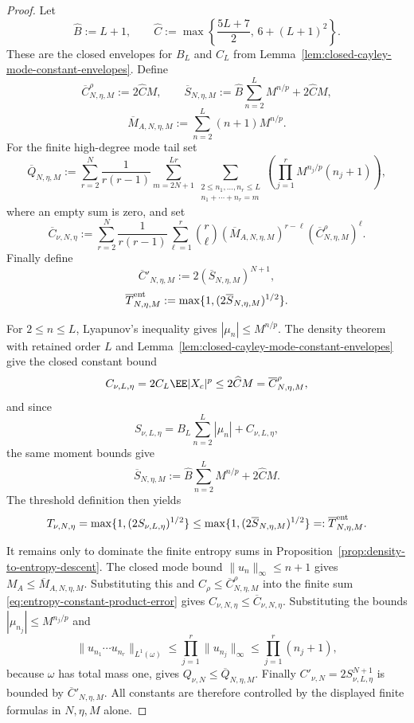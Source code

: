 \begin{proof}
Let
\[
\widehat B:=L+1,\qquad
\widehat C:=\max\!\left\{\frac{5L+7}{2},\,6+(L+1)^2\right\}.
\]
These are the closed envelopes for \(B_L\) and \(C_L\) from
Lemma~\ref{lem:closed-cayley-mode-constant-envelopes}.  Define
\[
\overline C_{N,\eta,M}^{\rho}:=2\widehat C M,
\qquad
\overline S_{N,\eta,M}:=
\widehat B\sum_{n=2}^{L}M^{n/p}+2\widehat C M,
\]
\[
\overline M_{A,N,\eta,M}:=\sum_{n=2}^{L}(n+1)M^{n/p}.
\]
For the finite high-degree mode tail set
\[
\overline Q_{N,\eta,M}:=
\sum_{r=2}^{N}\frac{1}{r(r-1)}
\sum_{m=2N+1}^{Lr}
\sum_{\substack{2\le n_1,\dots,n_r\le L\\
n_1+\cdots+n_r=m}}
\left(\prod_{j=1}^{r}M^{n_j/p}(n_j+1)\right),
\]
where an empty sum is zero,
and set
\[
\overline C_{\nu,N,\eta}:=
\sum_{r=2}^{N}\frac{1}{r(r-1)}
\sum_{\ell=1}^{r}\binom r\ell
(\overline M_{A,N,\eta,M})^{r-\ell}
(\overline C_{N,\eta,M}^{\rho})^\ell .
\]
Finally define
\[
\overline C'_{N,\eta,M}:=
2(\overline S_{N,\eta,M})^{N+1},
\]
\[
\overline T_{N,\eta,M}^{\rm ent}:=
\max\{1,(2\overline S_{N,\eta,M})^{1/2}\}.
\]

For \(2\le n\le L\), Lyapunov's inequality gives
\(|\mu_n|\le M^{n/p}\).  The density theorem with retained order \(L\) and
Lemma~\ref{lem:closed-cayley-mode-constant-envelopes} give the closed
constant bound
\[
C_{\nu,L,\eta}=2C_L\EE|X_c|^p\le2\widehat C M
=\overline C_{N,\eta,M}^{\rho},
\]
and since
\[
S_{\nu,L,\eta}=B_L\sum_{n=2}^{L}|\mu_n|+C_{\nu,L,\eta},
\]
the same moment bounds give
\[
\overline S_{N,\eta,M}:=
\widehat B\sum_{n=2}^{L}M^{n/p}+2\widehat C M .
\]
The threshold definition then yields
\[
T_{\nu,N,\eta}=\max\{1,(2S_{\nu,L,\eta})^{1/2}\}
\le \max\{1,(2\overline S_{N,\eta,M})^{1/2}\}
=:\overline T_{N,\eta,M}^{\rm ent}.
\]

It remains only to dominate the finite entropy sums in
Proposition~\ref{prop:density-to-entropy-descent}.  The closed mode bound
$\|u_n\|_\infty\le n+1$ gives
$M_A\le\overline M_{A,N,\eta,M}$.  Substituting this and
$C_\rho\le\overline C_{N,\eta,M}^{\rho}$ into the finite sum
\eqref{eq:entropy-constant-product-error} gives
\(C_{\nu,N,\eta}\le\overline C_{\nu,N,\eta}\).
Substituting the bounds
$|\mu_{n_j}|\le M^{n_j/p}$ and
\[
\|u_{n_1}\cdots u_{n_r}\|_{L^1(\omega)}
\le \prod_{j=1}^{r}\|u_{n_j}\|_\infty
\le \prod_{j=1}^{r}(n_j+1),
\]
because $\omega$ has total mass one, gives
\(Q_{\nu,N}\le\overline Q_{N,\eta,M}\).  Finally
\(C'_{\nu,N}=2S_{\nu,L,\eta}^{N+1}\) is bounded by
\(\overline C'_{N,\eta,M}\).  All constants are therefore controlled by the
displayed finite formulas in \(N,\eta,M\) alone.
\end{proof}

